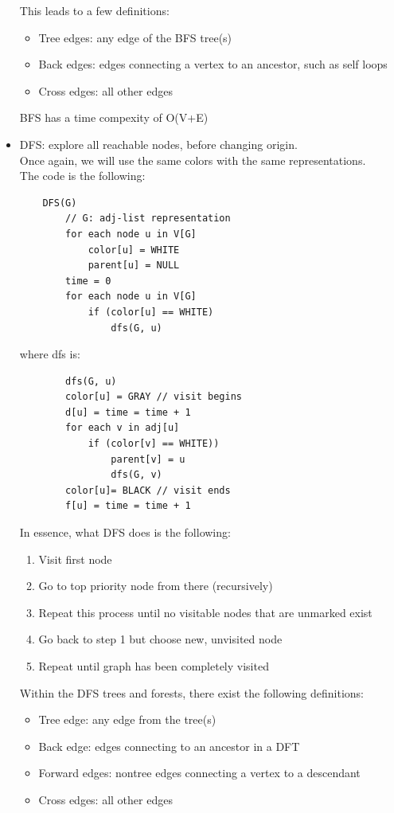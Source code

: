 \documentclass[nobib]{tufte-handout}
\begin{document}
\begin{itemize}
\begin{enumerate}
          \end{enumerate}
          This leads to a few definitions:
          \begin{itemize}
              \item Tree edges: any edge of the BFS tree(s)
              \item Back edges: edges connecting a vertex to an ancestor, such as self loops
              \item Cross edges: all other edges
          \end{itemize}
          BFS has a time compexity of O(V+E)
    \item DFS: explore all reachable nodes, before changing origin.\\ Once again, we will
          use the same colors with the same representations.\\ The code is the following:
          \begin{lstlisting}
    DFS(G)
        // G: adj-list representation
        for each node u in V[G]
            color[u] = WHITE
            parent[u] = NULL
        time = 0
        for each node u in V[G]
            if (color[u] == WHITE)
                dfs(G, u)
    \end{lstlisting}
          where dfs is:
          \begin{lstlisting}
        dfs(G, u)
        color[u] = GRAY // visit begins
        d[u] = time = time + 1
        for each v in adj[u]
            if (color[v] == WHITE))
                parent[v] = u
                dfs(G, v)
        color[u]= BLACK // visit ends
        f[u] = time = time + 1
    \end{lstlisting}
          In essence, what DFS does is the following:
          \begin{enumerate}
              \item Visit first node
              \item Go to top priority node from there (recursively)
              \item Repeat this process until no visitable nodes that are unmarked exist
              \item Go back to step 1 but choose new, unvisited node
              \item Repeat until graph has been completely visited
          \end{enumerate}
          Within the DFS trees and forests, there exist the following definitions:
          \begin{itemize}
              \item Tree edge: any edge from the tree(s)
              \item Back edge: edges connecting to an ancestor in a DFT
              \item Forward edges: nontree edges connecting a vertex to a descendant
              \item Cross edges: all other edges
          \end{itemize}
\end{itemize}
\end{document}
